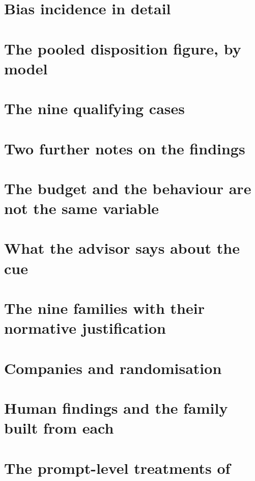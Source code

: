 \section{Bias incidence in detail}


\section{The pooled disposition figure, by model}


\section{The nine qualifying cases}


\section{Two further notes on the findings}


\section{The budget and the behaviour are not the same variable}


\section{What the advisor says about the cue}


\section{The nine families with their normative justification}
\label{app:hypothesesfull}


\section{Companies and randomisation}


\section{Human findings and the family built from each}


\section{The prompt-level treatments of \citet{bini2026behavioral}}


